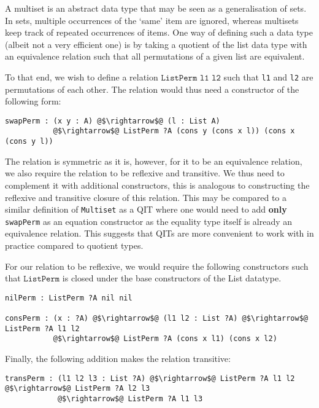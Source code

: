 \documentclass[12pt,twoside,maitrise]{dms}
\theoremstyle{definition}
\numberwithin{equation}{section}
\numberwithin{table}{chapter}
\numberwithin{figure}{chapter}
\newcommand\id[1] {\texttt{#1}}
\newcommand\fn[1] {\texttt{#1}}
\begin{document}
A multiset is an abstract data type that may be seen as a generalisation of
sets. In sets, multiple occurrences of the `same' item are ignored, whereas
multisets keep track of repeated occurrences of items. One way of defining such
a data type (albeit not a very efficient one) is by taking a quotient of the
list data type with an equivalence relation such that all permutations of a
given list are equivalent.

To that end, we wish to define a relation $\fn{ListPerm l1 l2}$ such that
\id{l1} and \id{l2} are permutations of each other. The relation would thus need
a constructor of the following form:

\begin{verbatim}
swapPerm : (x y : A) @$\rightarrow$@ (l : List A)
           @$\rightarrow$@ ListPerm ?A (cons y (cons x l)) (cons x (cons y l))
\end{verbatim}

The relation is symmetric as it is, however, for it to be an equivalence
relation, we also require the relation to be reflexive and transitive. We thus
need to complement it with additional constructors, this is analogous to
constructing the reflexive and transitive closure of this relation. This may be
compared to a similar definition of \id{Multiset} as a QIT where one would need
to add \textbf{only} \id{swapPerm} as an equation constructor as the equality
type itself is already an equivalence relation. This suggests that QITs are more
convenient to work with in practice compared to quotient types.

For our relation to be reflexive, we would require the following constructors
such that $\fn{ListPerm}$ is closed under the base constructors of the List
datatype.

\begin{verbatim}
nilPerm : ListPerm ?A nil nil

consPerm : (x : ?A) @$\rightarrow$@ (l1 l2 : List ?A) @$\rightarrow$@ ListPerm ?A l1 l2
           @$\rightarrow$@ ListPerm ?A (cons x l1) (cons x l2)
\end{verbatim}

Finally, the following addition makes the relation transitive:

\begin{verbatim}
transPerm : (l1 l2 l3 : List ?A) @$\rightarrow$@ ListPerm ?A l1 l2 @$\rightarrow$@ ListPerm ?A l2 l3
            @$\rightarrow$@ ListPerm ?A l1 l3
\end{verbatim}
\end{document}
